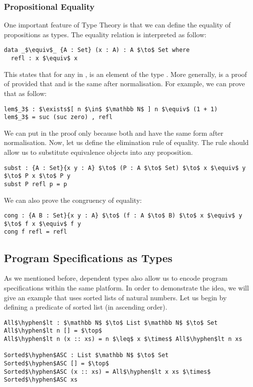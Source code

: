 \subsubsection{Propositional Equality} 
\par One important feature of Type Theory is
that we can define the equality of propositions as types. The
equality relation is interpreted as follow:
\begin{lstlisting}[mathescape=true,xleftmargin=.3\textwidth]
data _$\equiv$_ {A : Set} (x : A) : A $\to$ Set where
  refl : x $\equiv$ x
\end{lstlisting}

\par This states that for any  in ,  is an
element of the type . More generally,  is a
proof of  provided that  and  is the same
after normalisation. For example, we can prove that  as follow:
\begin{lstlisting}[mathescape=true,xleftmargin=.3\textwidth]
lem$_3$ : $\exists$[ n $\in$ $\mathbb N$ ] n $\equiv$ (1 + 1)
lem$_3$ = suc (suc zero) , refl
\end{lstlisting}

\par We can put  in the proof only because both
 and  have the same form after
normalisation. Now, let us define the elimination rule of
equality. The rule should allow us to substitute equivalence objects
into any proposition. 
\begin{lstlisting}[mathescape=true,xleftmargin=.3\textwidth]
subst : {A : Set}{x y : A} $\to$ (P : A $\to$ Set) $\to$ x $\equiv$ y $\to$ P x $\to$ P y
subst P refl p = p 
\end{lstlisting}
\par We can also prove the congruency of equality: 
\begin{lstlisting}[mathescape=true,xleftmargin=.3\textwidth]
cong : {A B : Set}{x y : A} $\to$ (f : A $\to$ B) $\to$ x $\equiv$ y $\to$ f x $\equiv$ f y
cong f refl = refl
\end{lstlisting}


\subsection{Program Specifications as Types}
\par As we mentioned before, dependent types also allow us to encode program
specifications within the same platform. In order to demonstrate the
idea, we will give an example that uses sorted lists of natural
numbers. Let us begin by defining a predicate
of sorted list (in ascending order). 
\begin{lstlisting}[mathescape=true,xleftmargin=.3\textwidth]
All$\hyphen$lt : $\mathbb N$ $\to$ List $\mathbb N$ $\to$ Set
All$\hyphen$lt n [] = $\top$
All$\hyphen$lt n (x :: xs) = n $\leq$ x $\times$ All$\hyphen$lt n xs

Sorted$\hyphen$ASC : List $\mathbb N$ $\to$ Set
Sorted$\hyphen$ASC [] = $\top$
Sorted$\hyphen$ASC (x :: xs) = All$\hyphen$lt x xs $\times$ Sorted$\hyphen$ASC xs
\end{lstlisting}

